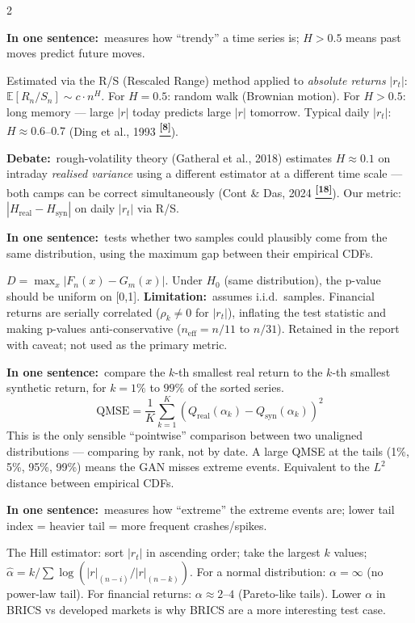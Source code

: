 \documentclass[10pt]{article}
\newcommand{\indigobox}[2]{\begin{tcolorbox}[mybox={Indigo}{IBg},title={#1}]#2\end{tcolorbox}}
\newcommand{\tcite}[1]{%
  \hyperlink{R:#1}{\textsuperscript{\scriptsize\textbf{[#1]}}}}
\newcommand{\E}{\mathbb{E}}
\begin{document}
\begin{multicols}{2}
\indigobox{Hurst Exponent ($H$)}{%
\textbf{In one sentence:}\ measures how ``trendy'' a time series is; $H > 0.5$ means past moves predict future moves.

Estimated via the R/S (Rescaled Range) method applied to \emph{absolute returns} $|r_t|$:
$\E[R_n/S_n] \sim c \cdot n^H$. For $H=0.5$: random walk (Brownian motion). For $H > 0.5$: long memory --- large $|r|$ today predicts large $|r|$ tomorrow. Typical daily $|r_t|$: $H \approx 0.6$--$0.7$ (Ding et al., 1993\tcite{8}).

\textbf{Debate:}\ rough-volatility theory (Gatheral et al., 2018) estimates $H \approx 0.1$ on intraday \emph{realised variance} using a different estimator at a different time scale --- both camps can be correct simultaneously (Cont \& Das, 2024\tcite{18}). Our metric: $|H_\text{real} - H_\text{syn}|$ on daily $|r_t|$ via R/S.}

\indigobox{KS Test (Kolmogorov-Smirnov)}{%
\textbf{In one sentence:}\ tests whether two samples could plausibly come from the same distribution, using the maximum gap between their empirical CDFs.

$D = \max_x |F_n(x) - G_m(x)|$. Under $H_0$ (same distribution), the p-value should be uniform on [0,1]. \textbf{Limitation:}\ assumes i.i.d.\ samples. Financial returns are serially correlated ($\rho_k \neq 0$ for $|r_t|$), inflating the test statistic and making p-values anti-conservative ($n_\text{eff} = n/11$ to $n/31$). Retained in the report with caveat; not used as the primary metric.}

\columnbreak

\indigobox{Quantile MSE (QMSE)}{%
\textbf{In one sentence:}\ compare the $k$-th smallest real return to the $k$-th smallest synthetic return, for $k = 1\%$ to $99\%$ of the sorted series.
\[\text{QMSE} = \frac{1}{K}\sum_{k=1}^K (Q_\text{real}(\alpha_k) - Q_\text{syn}(\alpha_k))^2\]
This is the only sensible ``pointwise'' comparison between two unaligned distributions --- comparing by rank, not by date. A large QMSE at the tails (1\%, 5\%, 95\%, 99\%) means the GAN misses extreme events. Equivalent to the $L^2$ distance between empirical CDFs.}

\indigobox{Tail Index (Hill Estimator)}{%
\textbf{In one sentence:}\ measures how ``extreme'' the extreme events are; lower tail index = heavier tail = more frequent crashes/spikes.

The Hill estimator: sort $|r_t|$ in ascending order; take the largest $k$ values; $\hat{\alpha} = k / \sum \log(|r|_{(n-i)}/|r|_{(n-k)})$. For a normal distribution: $\alpha = \infty$ (no power-law tail). For financial returns: $\alpha \approx 2$--$4$ (Pareto-like tails). Lower $\alpha$ in BRICS vs developed markets is why BRICS are a more interesting test case.}


\end{multicols}
\end{document}
